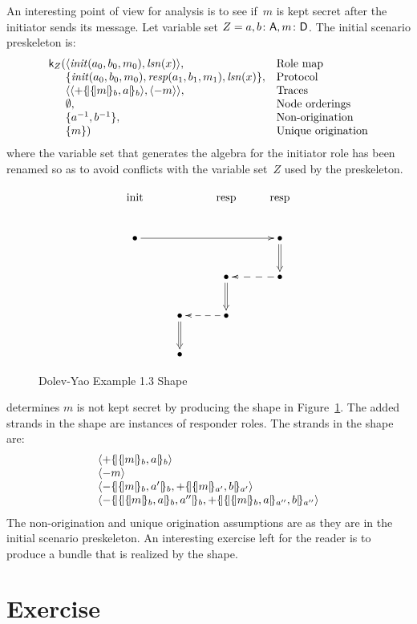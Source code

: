 \documentclass[12pt]{report}
\theoremstyle{definition}
\newcommand{\skel}{\mathsf{k}}
\newcommand{\lsn}{\fn{lsn}}
\newcommand{\init}{\fn{init}}
\newcommand{\resp}{\fn{resp}}
\begin{document}
An interesting point of view for analysis is to see if~$m$ is kept
secret after the initiator sends its message.  Let variable set
$Z=a,b\colon\mathsf{A}, m\colon\mathsf{D}$.  The initial scenario preskeleton is:
$$\begin{array}{r@{}ll}
\skel_Z(
&\seq{\init(a_0,b_0,m_0),\lsn(x)},
&\mbox{Role map}\\
&\{\init(a_0,b_0,m_0),\resp(a_1,b_1,m_1),\lsn(x)\},
&\mbox{Protocol}\\
&\seq{\seq{\outbnd\enc{\enc{m}{b},a}{b}},\seq{\inbnd m}},
&\mbox{Traces}\\
&\emptyset,
&\mbox{Node orderings}\\
&\{a^{-1},b^{-1}\},
&\mbox{Non-origination}\\
&\{m\})
&\mbox{Unique origination}
\end{array}$$
where the variable set that generates the algebra for the initiator
role has been renamed so as to avoid conflicts with the variable set~$Z$
used by the preskeleton.

\begin{figure}
$$\xymatrix{
\txt{\strut init}&\txt{\strut }&\txt{\strut resp}&\txt{\strut resp}\\
\bullet\ar[rrr]&&&\bullet\ar@{=>}[d]\\
&&\bullet\ar@{=>}[d]&\bullet\ar@{-->}[l]\\
&\bullet\ar@{=>}[d]&\bullet\ar@{-->}[l]&\\
&\bullet&&}$$
\caption{Dolev-Yao Example 1.3 Shape}\label{fig:dy shape}
\end{figure}

{\cpsa} determines $m$ is not kept secret by producing the shape in
Figure~\ref{fig:dy shape}.  The added strands in the shape are
instances of responder roles.  The strands in the shape are:
$$\begin{array}{l}
\seq{\outbnd\enc{\enc{m}{b},a}{b}}\\
\seq{\inbnd m}\\
\seq{\inbnd\enc{\enc{m}{b},a'}{b},\outbnd\enc{\enc{m}{a'},b}{a'}}\\
\seq{\inbnd\enc{\enc{\enc{m}{b}, a}{b},a''}{b},
\outbnd\enc{\enc{\enc{m}{b},a}{a''},b}{a''}}
\end{array}$$
The non-origination and unique origination assumptions are as they are
in the initial scenario preskeleton.  An interesting exercise left for
the reader is to produce a bundle that is realized by the shape.

\section{Exercise}
\end{document}
